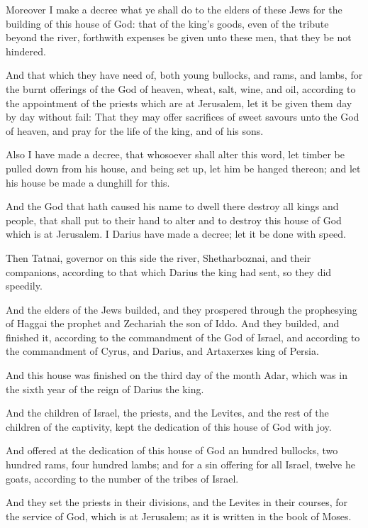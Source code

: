\verse Moreover I make a decree what ye shall do to the elders of these Jews for the building of this house of God: that of the king's goods, even of the tribute beyond the river, forthwith expenses be given unto these men, that they be not hindered.

\verse And that which they have need of, both young bullocks, and rams, and lambs, for the burnt offerings of the God of heaven, wheat, salt, wine, and oil, according to the appointment of the priests which are at Jerusalem, let it be given them day by day without fail: \verse That they may offer sacrifices of sweet savours unto the God of heaven, and pray for the life of the king, and of his sons.

\verse Also I have made a decree, that whosoever shall alter this word, let timber be pulled down from his house, and being set up, let him be hanged thereon; and let his house be made a dunghill for this.

\verse And the God that hath caused his name to dwell there destroy all kings and people, that shall put to their hand to alter and to destroy this house of God which is at Jerusalem. I Darius have made a decree; let it be done with speed.

\verse Then Tatnai, governor on this side the river, Shetharboznai, and their companions, according to that which Darius the king had sent, so they did speedily.

\verse And the elders of the Jews builded, and they prospered through the prophesying of Haggai the prophet and Zechariah the son of Iddo.  And they builded, and finished it, according to the commandment of the God of Israel, and according to the commandment of Cyrus, and Darius, and Artaxerxes king of Persia.

\verse And this house was finished on the third day of the month Adar, which was in the sixth year of the reign of Darius the king.

\verse And the children of Israel, the priests, and the Levites, and the rest of the children of the captivity, kept the dedication of this house of God with joy.

\verse And offered at the dedication of this house of God an hundred bullocks, two hundred rams, four hundred lambs; and for a sin offering for all Israel, twelve he goats, according to the number of the tribes of Israel.

\verse And they set the priests in their divisions, and the Levites in their courses, for the service of God, which is at Jerusalem; as it is written in the book of Moses.

